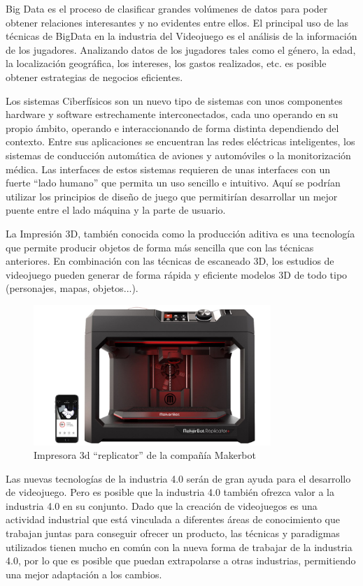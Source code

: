 Big Data es el proceso de clasificar grandes volúmenes de datos para poder obtener relaciones interesantes y no evidentes entre ellos. El principal uso de las técnicas de BigData en la industria del Videojuego es el análisis de la información de los jugadores. Analizando datos de los jugadores tales como el género, la edad, la localización geográfica, los intereses, los gastos realizados, etc. es posible obtener estrategias de negocios eficientes.

Los sistemas Ciberfísicos son un nuevo tipo de sistemas con unos componentes hardware y software estrechamente interconectados, cada uno operando en su propio ámbito, operando e interaccionando de forma distinta dependiendo del contexto\cite{cyber_physics}. Entre sus aplicaciones se encuentran las redes eléctricas inteligentes, los sistemas de conducción automática de aviones y automóviles o la monitorización médica. Las interfaces de estos sistemas requieren de unas interfaces con un fuerte ``lado humano'' que permita un uso sencillo e intuitivo. Aquí se podrían utilizar los principios de diseño de juego que permitirían desarrollar un mejor puente entre el lado máquina y la parte de usuario.

La Impresión 3D, también conocida como la producción aditiva es una tecnología que permite producir objetos de forma más sencilla que con las técnicas anteriores. En combinación con las técnicas de escaneado 3D, los estudios de videojuego pueden generar de forma rápida y eficiente modelos 3D de todo tipo (personajes, mapas, objetos...).

\begin{figure}[h]
    \centering
    \includegraphics[width=0.8\textwidth]{images/estadodelarte/mercado/impresion-3d}
    \caption{Impresora 3d ``replicator'' de la compañía Makerbot}
\end{figure}

Las nuevas tecnologías de la industria 4.0 serán de gran ayuda para el desarrollo de videojuego. Pero es posible que la industria 4.0 también ofrezca valor a la industria 4.0 en su conjunto. Dado que la creación de videojuegos es una actividad industrial que está vinculada a diferentes áreas de conocimiento que trabajan juntas para conseguir ofrecer un producto, las técnicas y paradigmas utilizados tienen mucho en común con la nueva forma de trabajar de la industria 4.0, por lo que es posible que puedan extrapolarse a otras industrias, permitiendo una mejor adaptación a los cambios.
